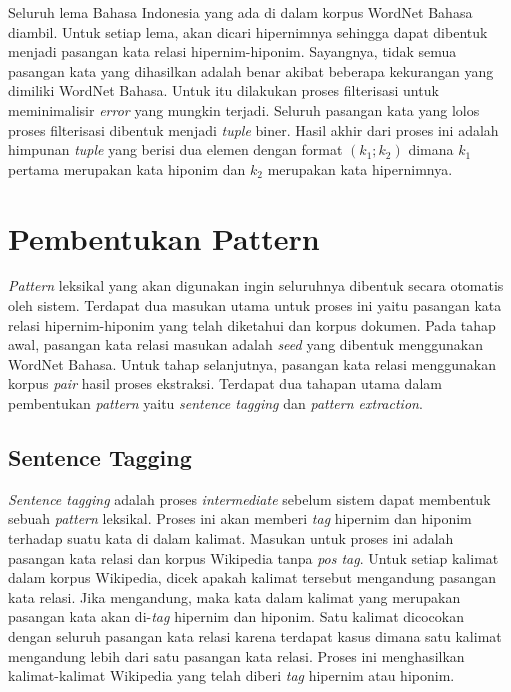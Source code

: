 Seluruh lema Bahasa Indonesia yang ada di dalam korpus WordNet Bahasa diambil. Untuk setiap lema, akan dicari hipernimnya sehingga dapat dibentuk menjadi pasangan kata relasi hipernim-hiponim. Sayangnya, tidak semua pasangan kata yang dihasilkan adalah benar akibat beberapa kekurangan yang dimiliki WordNet Bahasa. Untuk itu dilakukan proses filterisasi untuk meminimalisir \textit{error} yang mungkin terjadi. Seluruh pasangan kata yang lolos proses filterisasi dibentuk menjadi \textit{tuple} biner. Hasil akhir dari proses ini adalah himpunan \textit{tuple} yang berisi dua elemen dengan format $(k_1;k_2)$ dimana $k_1$ pertama merupakan kata hiponim dan $k_2$ merupakan kata hipernimnya.


\section{Pembentukan Pattern}
\textit{Pattern} leksikal yang akan digunakan ingin seluruhnya dibentuk secara otomatis oleh sistem. Terdapat dua masukan utama untuk proses ini yaitu pasangan kata relasi hipernim-hiponim yang telah diketahui dan korpus dokumen. Pada tahap awal, pasangan kata relasi masukan adalah \textit{seed} yang dibentuk menggunakan WordNet Bahasa. Untuk tahap selanjutnya, pasangan kata relasi menggunakan korpus \textit{pair} hasil proses ekstraksi. Terdapat dua tahapan utama dalam pembentukan \textit{pattern} yaitu \textit{sentence tagging} dan \textit{pattern extraction}.

\subsection{Sentence Tagging}
\textit{Sentence tagging} adalah proses \textit{intermediate} sebelum sistem dapat membentuk sebuah \textit{pattern} leksikal. Proses ini akan memberi \textit{tag} hipernim dan hiponim terhadap suatu kata di dalam kalimat. Masukan untuk proses ini adalah pasangan kata relasi dan korpus Wikipedia tanpa \textit{pos tag}. Untuk setiap kalimat dalam korpus Wikipedia, dicek apakah kalimat tersebut mengandung pasangan kata relasi. Jika mengandung, maka kata dalam kalimat yang merupakan pasangan kata akan di-\textit{tag} hipernim dan hiponim. Satu kalimat dicocokan dengan seluruh pasangan kata relasi karena terdapat kasus dimana satu kalimat mengandung lebih dari satu pasangan kata relasi. Proses ini menghasilkan kalimat-kalimat Wikipedia yang telah diberi \textit{tag} hipernim atau hiponim.

